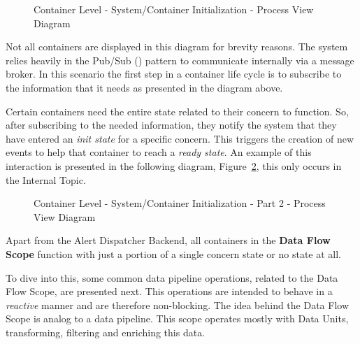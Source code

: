 \begin{figure}[H]
   \centering
   \resizebox{\columnwidth}{!}
   {
      
   }
   \caption[Container Level - System/Container Initialization - Process View Diagram]{Container Level - System/Container Initialization - Process View Diagram}
   \label{fig:design:architecture:platform:container:process:diagram:init}
\end{figure}

Not all containers are displayed in this diagram for brevity reasons.
The system relies heavily in the Pub/Sub (\cite{pubsub}) pattern to communicate internally via a message broker. In this scenario the first step in a container life cycle is to subscribe to the information that it needs as presented in the diagram above.

Certain containers need the entire state related to their concern to function. So, after subscribing to the needed information, they notify the system that they have entered an \textit{init state} for a specific concern. This triggers the creation of new events to help that container to reach a \textit{ready state}. An example of this interaction is presented in the following diagram, Figure~\ref{fig:design:architecture:platform:container:process:diagram:ready}, this only occurs in the Internal Topic.

\begin{figure}[H]
   \centering
   \resizebox{\columnwidth}{!}
   {
      
   }
   \caption[Container Level - System/Container Initialization - Part 2 - Process View Diagram]{Container Level - System/Container Initialization - Part 2 - Process View Diagram}
   \label{fig:design:architecture:platform:container:process:diagram:ready}
\end{figure}

Apart from the Alert Dispatcher Backend, all containers in the \textbf{Data Flow Scope} function with just a portion of a single concern state or no state at all.

To dive into this, some common data pipeline operations, related to the Data Flow Scope, are presented next. This operations are intended to behave in a \textit{reactive} manner \parencite{reactivemanifesto} and are therefore non-blocking. The idea behind the Data Flow Scope is analog to a data pipeline. This scope operates mostly with Data Units, transforming, filtering and enriching this data.

